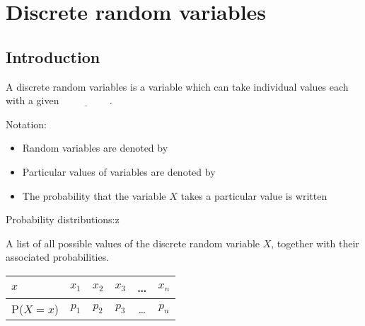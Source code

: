 \newpage
\section{Discrete random variables}

\subsection{Introduction}

A discrete random variables is a variable which can take individual values each with a given $\underline{\hspace{2cm}}$.

\medskip

Notation:


\begin{itemize}
	\setlength\itemsep{0.5em}
	\item Random variables are denoted by \underline{\hspace{3cm}}
	\item Particular values of variables are denoted by \underline{\hspace{3cm}}
	\item The probability that the variable $X$ takes a particular value  is written  \underline{\hspace{3cm}}
\end{itemize}


Probability distributions:z
\medskip

A list of all possible values of the discrete random variable $X$, together with their associated probabilities.

\begin{table}[!htpb]
	\centering
	\begin{tabular}{|l|c|c|c|c|c|}
		\hline
		$x $     & $x_1$ & $x_2$ & $x_3$ & \ldots & $x_n$ \\ \hline
		P($X=x$) & $p_1$ & $p_2$ & $p_3$ & \ldots & $p_n$ \\ \hline
	\end{tabular}
\end{table}
	
